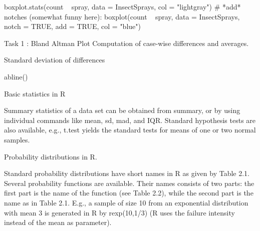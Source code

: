 
 
boxplot.stats(count ~ spray, data = InsectSprays, col = "lightgray")
# *add* notches (somewhat funny here):
boxplot(count ~ spray, data = InsectSprays,        notch = TRUE, add = TRUE, col = "blue")



 
Task 1 : Bland Altman Plot
Computation of case-wise differences and averages.
 
Standard deviation of differences
 
abline()
 

Basic statistics in R

Summary statistics of a data set can be obtained from summary, or by using individual commands
like mean, sd, mad, and IQR. Standard hypothesis tests are also available, e.g., t.test
yields the standard tests for means of one or two normal samples. 
 
Probability distributions in R.

Standard probability distributions have short names in R as given by Table 2.1. Several
probability functions are available. Their names consists of two parts: the first part is the
name of the function (see Table 2.2), while the second part is the name as in Table 2.1.
E.g., a sample of size 10 from an exponential distribution with mean 3 is generated in R by
rexp(10,1/3) (R uses the failure intensity instead of the mean as parameter).

